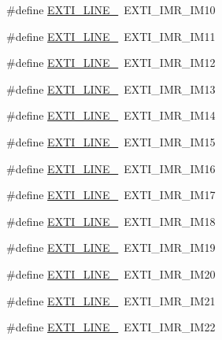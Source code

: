 \begin{DoxyCompactItemize}
\#define \hyperlink{group___e_x_t_i___line_gac94dbc4ff94b573f4dd796d60dcd250c}{E\+X\+T\+I\+\_\+\+L\+I\+N\+E\+\_}~E\+X\+T\+I\+\_\+\+I\+M\+R\+\_\+\+I\+M10
\item 
\#define \hyperlink{group___e_x_t_i___line_ga301648b2965852f535209429f71e251b}{E\+X\+T\+I\+\_\+\+L\+I\+N\+E\+\_}~E\+X\+T\+I\+\_\+\+I\+M\+R\+\_\+\+I\+M11
\item 
\#define \hyperlink{group___e_x_t_i___line_ga4ff15c98aec7cd3fd0f0c5bd5cfaa501}{E\+X\+T\+I\+\_\+\+L\+I\+N\+E\+\_}~E\+X\+T\+I\+\_\+\+I\+M\+R\+\_\+\+I\+M12
\item 
\#define \hyperlink{group___e_x_t_i___line_ga8e144f1beae1e5d259f5d4aed6a3efe0}{E\+X\+T\+I\+\_\+\+L\+I\+N\+E\+\_}~E\+X\+T\+I\+\_\+\+I\+M\+R\+\_\+\+I\+M13
\item 
\#define \hyperlink{group___e_x_t_i___line_ga60b812a0a6fe00af8db8763b8202a463}{E\+X\+T\+I\+\_\+\+L\+I\+N\+E\+\_}~E\+X\+T\+I\+\_\+\+I\+M\+R\+\_\+\+I\+M14
\item 
\#define \hyperlink{group___e_x_t_i___line_ga9e711303de4e32d120d2551dc5c64dd7}{E\+X\+T\+I\+\_\+\+L\+I\+N\+E\+\_}~E\+X\+T\+I\+\_\+\+I\+M\+R\+\_\+\+I\+M15
\item 
\#define \hyperlink{group___e_x_t_i___line_ga92cf76ca2f7a5638944ccd94e842ebb1}{E\+X\+T\+I\+\_\+\+L\+I\+N\+E\+\_}~E\+X\+T\+I\+\_\+\+I\+M\+R\+\_\+\+I\+M16
\item 
\#define \hyperlink{group___e_x_t_i___line_ga9d09e51fda52def20bd23a0c42da3014}{E\+X\+T\+I\+\_\+\+L\+I\+N\+E\+\_}~E\+X\+T\+I\+\_\+\+I\+M\+R\+\_\+\+I\+M17
\item 
\#define \hyperlink{group___e_x_t_i___line_ga8f420801658edbe81973c670ed97913e}{E\+X\+T\+I\+\_\+\+L\+I\+N\+E\+\_}~E\+X\+T\+I\+\_\+\+I\+M\+R\+\_\+\+I\+M18
\item 
\#define \hyperlink{group___e_x_t_i___line_gaa69d86266839e0980ad222192760c760}{E\+X\+T\+I\+\_\+\+L\+I\+N\+E\+\_}~E\+X\+T\+I\+\_\+\+I\+M\+R\+\_\+\+I\+M19
\item 
\#define \hyperlink{group___e_x_t_i___line_ga1d35577fb74cdbf58431570bd763f615}{E\+X\+T\+I\+\_\+\+L\+I\+N\+E\+\_}~E\+X\+T\+I\+\_\+\+I\+M\+R\+\_\+\+I\+M20
\item 
\#define \hyperlink{group___e_x_t_i___line_gaae9d458581e656ab574d6d56b9844587}{E\+X\+T\+I\+\_\+\+L\+I\+N\+E\+\_}~E\+X\+T\+I\+\_\+\+I\+M\+R\+\_\+\+I\+M21
\item 
\#define \hyperlink{group___e_x_t_i___line_gacf5c5aed8ca5e9a3a3128d314cbe1f7f}{E\+X\+T\+I\+\_\+\+L\+I\+N\+E\+\_}~E\+X\+T\+I\+\_\+\+I\+M\+R\+\_\+\+I\+M22
\end{DoxyCompactItemize}


